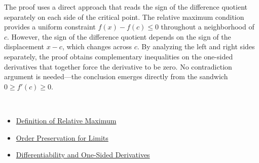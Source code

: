 \begin{remark*}
The proof uses a direct approach that reads the sign of the difference quotient separately on each side of the critical point. The relative maximum condition provides a uniform constraint $f(x) - f(c) \leq 0$ throughout a neighborhood of $c$. However, the sign of the difference quotient depends on the sign of the displacement $x - c$, which changes across $c$. By analyzing the left and right sides separately, the proof obtains complementary inequalities on the one-sided derivatives that together force the derivative to be zero. No contradiction argument is needed—the conclusion emerges directly from the sandwich $0 \geq f'(c) \geq 0$.
\end{remark*}

\begin{remark*}[Dependencies]~\\
\begin{itemize}
  \item \hyperref[def:relative-maximum]{Definition of Relative Maximum}
  \item \hyperref[thm:order-preservation-limits]{Order Preservation for Limits}
  \item \hyperref[thm:differentiability-one-sided]{Differentiability and One-Sided Derivatives}
\end{itemize}
\end{remark*}